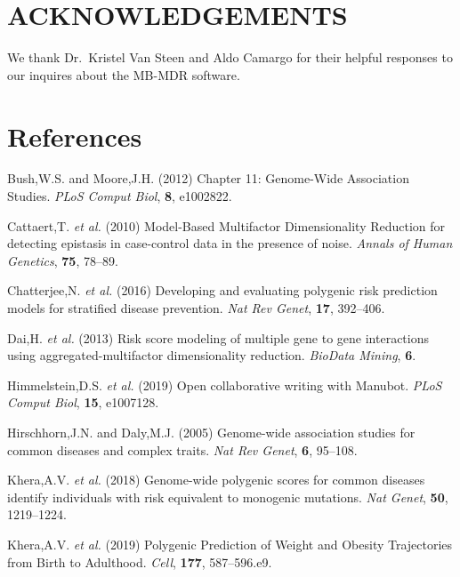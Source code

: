 \documentclass[a4paper,twoside, 9pt]{article}
\begin{document}
\hypertarget{acknowledgement}{%
\section{\uppercase{Acknowledgements}}\label{acknowledgement}}

We thank Dr.~Kristel Van Steen and Aldo Camargo for their helpful
responses to our inquires about the MB-MDR software.

\hypertarget{references}{%
\section*{References}\label{references}}

\hypertarget{refs}{}
\leavevmode\hypertarget{ref-iFUfVw9V}{}%
Bush,W.S. and Moore,J.H. (2012) Chapter 11: Genome-Wide Association
Studies. \emph{PLoS Comput Biol}, \textbf{8}, e1002822.

\leavevmode\hypertarget{ref-16AnEAMje}{}%
Cattaert,T. \emph{et al.} (2010) Model-Based Multifactor Dimensionality
Reduction for detecting epistasis in case-control data in the presence
of noise. \emph{Annals of Human Genetics}, \textbf{75}, 78--89.

\leavevmode\hypertarget{ref-auyRflEe}{}%
Chatterjee,N. \emph{et al.} (2016) Developing and evaluating polygenic
risk prediction models for stratified disease prevention. \emph{Nat Rev
Genet}, \textbf{17}, 392--406.

\leavevmode\hypertarget{ref-93PfLXPZ}{}%
Dai,H. \emph{et al.} (2013) Risk score modeling of multiple gene to gene
interactions using aggregated-multifactor dimensionality reduction.
\emph{BioData Mining}, \textbf{6}.

\leavevmode\hypertarget{ref-YuJbg3zO}{}%
Himmelstein,D.S. \emph{et al.} (2019) Open collaborative writing with
Manubot. \emph{PLoS Comput Biol}, \textbf{15}, e1007128.

\leavevmode\hypertarget{ref-5cdeEdUS}{}%
Hirschhorn,J.N. and Daly,M.J. (2005) Genome-wide association studies for
common diseases and complex traits. \emph{Nat Rev Genet}, \textbf{6},
95--108.

\leavevmode\hypertarget{ref-Gh0gKn77}{}%
Khera,A.V. \emph{et al.} (2018) Genome-wide polygenic scores for common
diseases identify individuals with risk equivalent to monogenic
mutations. \emph{Nat Genet}, \textbf{50}, 1219--1224.

\leavevmode\hypertarget{ref-oBD9eYkN}{}%
Khera,A.V. \emph{et al.} (2019) Polygenic Prediction of Weight and
Obesity Trajectories from Birth to Adulthood. \emph{Cell}, \textbf{177},
587--596.e9.
\end{document}
